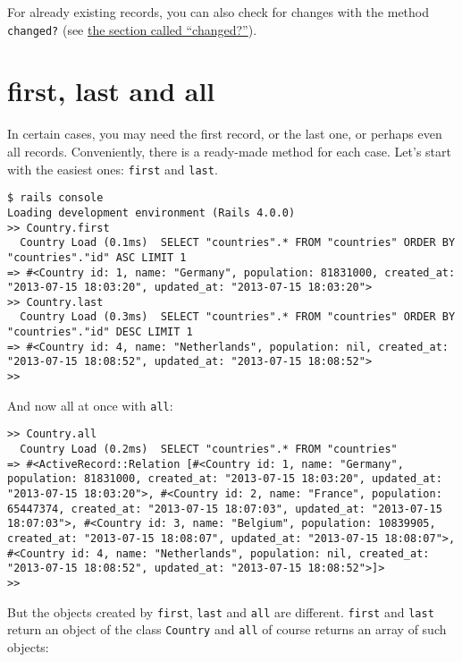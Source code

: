 \documentclass[a4paper]{book}
\begin{document}
For already existing records, you can also check for changes with the method \texttt{changed?} (see \hyperref[activerecordux5fchanged]{the section called “changed?”}).

\section{first, last and all}\label{first-last-and-all}

In certain cases, you may need the first record, or the last one, or perhaps even all records. Conveniently, there is a ready-made method for each case. Let's start with the easiest ones: \texttt{first} and \texttt{last}.

\begin{shaded}\begin{verbatim}
$ rails console
Loading development environment (Rails 4.0.0)
>> Country.first
  Country Load (0.1ms)  SELECT "countries".* FROM "countries" ORDER BY "countries"."id" ASC LIMIT 1
=> #<Country id: 1, name: "Germany", population: 81831000, created_at: "2013-07-15 18:03:20", updated_at: "2013-07-15 18:03:20">
>> Country.last
  Country Load (0.3ms)  SELECT "countries".* FROM "countries" ORDER BY "countries"."id" DESC LIMIT 1
=> #<Country id: 4, name: "Netherlands", population: nil, created_at: "2013-07-15 18:08:52", updated_at: "2013-07-15 18:08:52">
>>
\end{verbatim}\end{shaded}

And now all at once with \texttt{all}:

\begin{shaded}\begin{verbatim}
>> Country.all
  Country Load (0.2ms)  SELECT "countries".* FROM "countries"
=> #<ActiveRecord::Relation [#<Country id: 1, name: "Germany", population: 81831000, created_at: "2013-07-15 18:03:20", updated_at: "2013-07-15 18:03:20">, #<Country id: 2, name: "France", population: 65447374, created_at: "2013-07-15 18:07:03", updated_at: "2013-07-15 18:07:03">, #<Country id: 3, name: "Belgium", population: 10839905, created_at: "2013-07-15 18:08:07", updated_at: "2013-07-15 18:08:07">, #<Country id: 4, name: "Netherlands", population: nil, created_at: "2013-07-15 18:08:52", updated_at: "2013-07-15 18:08:52">]>
>>
\end{verbatim}\end{shaded}

But the objects created by \texttt{first}, \texttt{last} and \texttt{all} are different. \texttt{first} and \texttt{last} return an object of the class \texttt{Country} and \texttt{all} of course returns an array of such objects:
\end{document}
